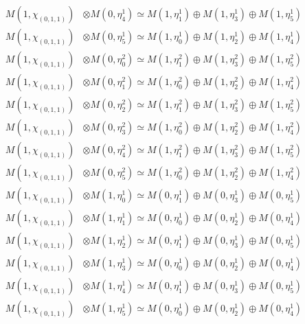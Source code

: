\begin{align*}
M(1,\chi_{(0,1,1)}) &\otimes M(0,\eta^{1}_{4}) \simeq M(1,\eta^{1}_{1}) \oplus M(1,\eta^{1}_{3}) \oplus M(1,\eta^{1}_{5}) \\
M(1,\chi_{(0,1,1)}) &\otimes M(0,\eta^{1}_{5}) \simeq M(1,\eta^{1}_{0}) \oplus M(1,\eta^{1}_{2}) \oplus M(1,\eta^{1}_{4}) \\
M(1,\chi_{(0,1,1)}) &\otimes M(0,\eta^{2}_{0}) \simeq M(1,\eta^{2}_{1}) \oplus M(1,\eta^{2}_{3}) \oplus M(1,\eta^{2}_{5}) \\
M(1,\chi_{(0,1,1)}) &\otimes M(0,\eta^{2}_{1}) \simeq M(1,\eta^{2}_{0}) \oplus M(1,\eta^{2}_{2}) \oplus M(1,\eta^{2}_{4}) \\
M(1,\chi_{(0,1,1)}) &\otimes M(0,\eta^{2}_{2}) \simeq M(1,\eta^{2}_{1}) \oplus M(1,\eta^{2}_{3}) \oplus M(1,\eta^{2}_{5}) \\
M(1,\chi_{(0,1,1)}) &\otimes M(0,\eta^{2}_{3}) \simeq M(1,\eta^{2}_{0}) \oplus M(1,\eta^{2}_{2}) \oplus M(1,\eta^{2}_{4}) \\
M(1,\chi_{(0,1,1)}) &\otimes M(0,\eta^{2}_{4}) \simeq M(1,\eta^{2}_{1}) \oplus M(1,\eta^{2}_{3}) \oplus M(1,\eta^{2}_{5}) \\
M(1,\chi_{(0,1,1)}) &\otimes M(0,\eta^{2}_{5}) \simeq M(1,\eta^{2}_{0}) \oplus M(1,\eta^{2}_{2}) \oplus M(1,\eta^{2}_{4}) \\
M(1,\chi_{(0,1,1)}) &\otimes M(1,\eta^{1}_{0}) \simeq M(0,\eta^{1}_{1}) \oplus M(0,\eta^{1}_{3}) \oplus M(0,\eta^{1}_{5}) \\
M(1,\chi_{(0,1,1)}) &\otimes M(1,\eta^{1}_{1}) \simeq M(0,\eta^{1}_{0}) \oplus M(0,\eta^{1}_{2}) \oplus M(0,\eta^{1}_{4}) \\
M(1,\chi_{(0,1,1)}) &\otimes M(1,\eta^{1}_{2}) \simeq M(0,\eta^{1}_{1}) \oplus M(0,\eta^{1}_{3}) \oplus M(0,\eta^{1}_{5}) \\
M(1,\chi_{(0,1,1)}) &\otimes M(1,\eta^{1}_{3}) \simeq M(0,\eta^{1}_{0}) \oplus M(0,\eta^{1}_{2}) \oplus M(0,\eta^{1}_{4}) \\
M(1,\chi_{(0,1,1)}) &\otimes M(1,\eta^{1}_{4}) \simeq M(0,\eta^{1}_{1}) \oplus M(0,\eta^{1}_{3}) \oplus M(0,\eta^{1}_{5}) \\
M(1,\chi_{(0,1,1)}) &\otimes M(1,\eta^{1}_{5}) \simeq M(0,\eta^{1}_{0}) \oplus M(0,\eta^{1}_{2}) \oplus M(0,\eta^{1}_{4}) \\
\end{align*}

